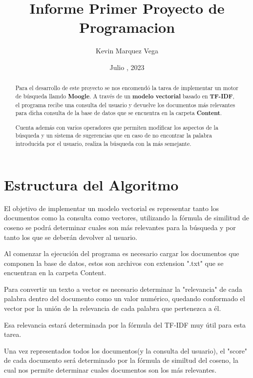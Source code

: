 \documentclass{article}
\begin{document}
\lstset{style = myCSharp}

\title{Informe Primer Proyecto de Programacion}
\author{Kevin Marquez Vega}
\date{Julio , 2023}

\maketitle

\begin{abstract}
    Para el desarrollo de este proyecto se nos encomendó la tarea de implementar un motor de búsqueda llamdo \textbf{Moogle}.
     A través de un \textbf{modelo vectorial} basado en \textbf{TF-IDF}, el programa recibe una consulta del usuario y devuelve los documentos
     más relevantes para dicha consulta de la base de datos que se encuentra en la carpeta \textbf{Content}.

     Cuenta además con varios operadores que permiten modificar los aspectos de la búsqueda y un sistema de sugerencias que
     en caso de no encontrar la palabra introducida por el usuario, realiza la búsqueda con la más semejante.
\end{abstract}

\newpage
\tableofcontents
\newpage
\section*{Estructura del Algoritmo}
El objetivo de implementar un modelo vectorial es representar tanto los documentos como la consulta como vectores, utilizando la fórmula de similitud
de coseno se podrá determinar cuales son más relevantes para la búsqueda y por tanto los que se deberán devolver al usuario.

Al comenzar la ejecución del programa es necesario cargar los documentos que componen la base de datos, estos son archivos
con extension ".txt" que se encuentran en la carpeta Content.

Para convertir un texto a vector es necesario determinar la "relevancia" de cada palabra dentro del documento como un valor numérico, quedando conformado
el vector por la unión de la relevancia de cada palabra que pertenezca a él.

Esa relevancia estará determinada por la fórmula del TF-IDF muy útil para esta tarea.

Una vez representados todos los documentos(y la consulta del usuario), el "score" de cada documento será determinado por la fórmula de similtud del coseno, la cual nos permite
determinar cuales documentos son los más relevantes.
\end{document}
